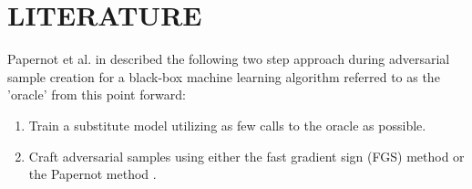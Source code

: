 \section{LITERATURE} \label{sec:literature}

Papernot et al. in  described the following two step approach during adversarial sample creation for a black-box machine learning algorithm referred to as the 'oracle' from this point forward:
\begin{enumerate}
\item \label{step1} Train a substitute model utilizing as few calls to the oracle as possible.  
\item \label{step2} Craft adversarial samples using either the fast gradient sign (FGS) method \cite{papernot3} or the Papernot method \cite{papernot2}. 
\end{enumerate}

